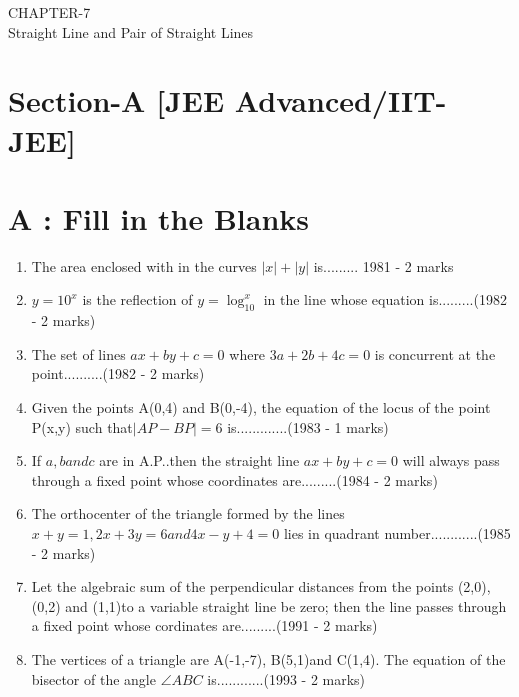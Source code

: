 \documentclass[12pt]{article}
\begin{document}
\begin{center}
\textbf\large{CHAPTER-7 \\ Straight Line and Pair of Straight Lines}

\end{center}

\section*{Section-A    [JEE Advanced/IIT-JEE]}
\section*{A    :  Fill in the Blanks}
\begin{enumerate}

\item  The area enclosed with in the curves $|x|+|y|$ is.........  1981 - 2 marks\\
\item  $y=10^x$ is the reflection of $y=\log_10^x $ in the line whose equation is.........(1982 - 2 marks)\\
\item The set of lines $ax+by+c=0$ where $3a+2b+4c=0$ is concurrent at the point..........(1982 - 2 marks)\\
\item  Given the points A(0,4) and B(0,-4), the equation of the locus of the point P(x,y) such that$|AP-BP|=6$ is.............(1983 - 1 marks)\\
\item  If $a,b and c$ are in A.P..then the straight line $ax+by+c=0$ will always pass through a fixed point whose coordinates are.........(1984 - 2 marks)\\
\item  The orthocenter of the triangle formed by the lines $x+y=1, 2x+3y=6  and  4x-y+4=0$ lies in quadrant number............(1985 - 2 marks)\\
\item Let the algebraic sum of the perpendicular distances from the points (2,0), (0,2) and (1,1)to a variable straight line be zero; then the line passes through a fixed point whose cordinates are.........(1991 - 2 marks)\\
\item The vertices of a triangle are  A(-1,-7), B(5,1)and C(1,4). The equation of the bisector of the angle $\angle{ABC}$ is............(1993 - 2 marks)\\

\end{enumerate}
\end{document}
